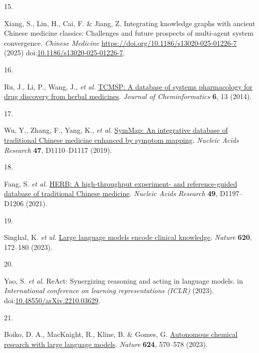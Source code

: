 \documentclass[
]{article}
\newlength{\cslhangindent}
\newlength{\csllabelwidth}
\newlength{\cslentryspacingunit} %
\newenvironment{CSLReferences}[2] %
 {%
  \setlength{\parindent}{0pt}
  \ifodd #1
  \let\oldpar\par
  \def\par{\hangindent=\cslhangindent\oldpar}
  \fi
  \setlength{\parskip}{#2\cslentryspacingunit}
 }%
 {}
\newcommand{\CSLLeftMargin}[1]{\parbox[t]{\csllabelwidth}{#1}}
\newcommand{\CSLRightInline}[1]{\parbox[t]{\linewidth - \csllabelwidth}{#1}\break}
\begin{document}
\begin{CSLReferences}{0}{0}
\leavevmode{}%
\CSLLeftMargin{15. }%
\CSLRightInline{Xiang, S., Lin, H., Cai, F. \& Jiang, Z. Integrating
knowledge graphs with ancient {Chinese} medicine classics: Challenges
and future prospects of multi-agent system convergence. \emph{Chinese
Medicine} \url{https://doi.org/10.1186/s13020-025-01226-7} (2025)
doi:\href{https://doi.org/10.1186/s13020-025-01226-7}{10.1186/s13020-025-01226-7}.}

\leavevmode{}%
\CSLLeftMargin{16. }%
\CSLRightInline{Ru, J., Li, P., Wang, J., \emph{et al.}
\href{https://doi.org/10.1186/1758-2946-6-13}{{TCMSP}: A database of
systems pharmacology for drug discovery from herbal medicines}.
\emph{Journal of Cheminformatics} \textbf{6}, 13 (2014).}

\leavevmode{}%
\CSLLeftMargin{17. }%
\CSLRightInline{Wu, Y., Zhang, F., Yang, K., \emph{et al.}
\href{https://doi.org/10.1093/nar/gky1021}{{SymMap}: An integrative
database of traditional {Chinese} medicine enhanced by symptom mapping}.
\emph{Nucleic Acids Research} \textbf{47}, D1110--D1117 (2019).}

\leavevmode{}%
\CSLLeftMargin{18. }%
\CSLRightInline{Fang, S. \emph{et al.}
\href{https://doi.org/10.1093/nar/gkaa1063}{{HERB}: A high-throughput
experiment- and reference-guided database of traditional {Chinese}
medicine}. \emph{Nucleic Acids Research} \textbf{49}, D1197--D1206
(2021).}

\leavevmode{}%
\CSLLeftMargin{19. }%
\CSLRightInline{Singhal, K. \emph{et al.}
\href{https://doi.org/10.1038/s41586-023-06291-2}{Large language models
encode clinical knowledge}. \emph{Nature} \textbf{620}, 172--180
(2023).}

\leavevmode{}%
\CSLLeftMargin{20. }%
\CSLRightInline{Yao, S. \emph{et al.} {ReAct}: Synergizing reasoning and
acting in language models. in \emph{International conference on learning
representations (ICLR)} (2023).
doi:\href{https://doi.org/10.48550/arXiv.2210.03629}{10.48550/arXiv.2210.03629}.}

\leavevmode{}%
\CSLLeftMargin{21. }%
\CSLRightInline{Boiko, D. A., MacKnight, R., Kline, B. \& Gomes, G.
\href{https://doi.org/10.1038/s41586-023-06792-0}{Autonomous chemical
research with large language models}. \emph{Nature} \textbf{624},
570--578 (2023).}


\end{CSLReferences}
\end{document}
